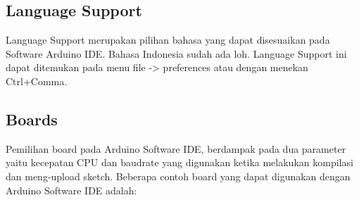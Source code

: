 \subsection{Language Support}

Language Support merupakan pilihan bahasa yang dapat disesuaikan pada Software Arduino IDE. Bahasa Indonesia sudah ada loh. Language Support ini dapat ditemukan pada menu file -> preferences atau dengan menekan Ctrl+Comma.

\subsection{Boards}
Pemilihan board pada Arduino Software IDE, berdampak pada dua parameter yaitu kecepatan CPU dan baudrate yang digunakan ketika melakukan kompilasi dan meng-upload sketch. Beberapa contoh board yang dapat digunakan dengan Arduino Software IDE adalah:
